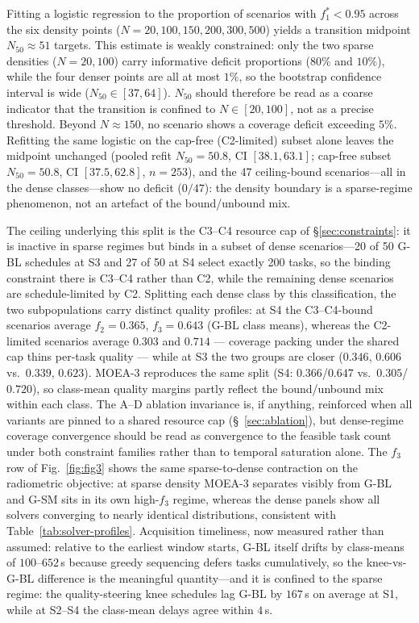 \documentclass[preprint,12pt,authoryear]{elsarticle}
\begin{document}
Fitting a logistic regression to the proportion of scenarios with
$f_1^* < 0.95$ across the six density points ($N=20, 100, 150, 200, 300, 500$)
yields a transition midpoint $N_{50} \approx 51$ targets. This estimate is
weakly constrained: only the two sparse densities ($N=20, 100$) carry
informative deficit proportions ($80\%$ and $10\%$), while the four denser
points are all at most $1\%$, so the bootstrap confidence interval is wide
($N_{50} \in [37, 64]$). $N_{50}$ should therefore be read as a coarse indicator that the
transition is confined to $N \in [20, 100]$, not as a precise threshold.
Beyond $N \approx 150$, no scenario shows a
coverage deficit exceeding $5\%$. Refitting the same logistic on the
cap-free (C2-limited) subset alone leaves the midpoint unchanged (pooled
refit $N_{50} = 50.8$, CI $[38.1, 63.1]$; cap-free subset $N_{50} = 50.8$,
CI $[37.5, 62.8]$, $n=253$), and the 47 ceiling-bound scenarios---all in
the dense classes---show no deficit ($0/47$): the density boundary is a
sparse-regime phenomenon, not an artefact of the bound/unbound mix.

The ceiling underlying this split is the C3--C4 resource cap of
\S\ref{sec:constraints}: it is inactive in sparse regimes but binds in a
subset of dense scenarios---20 of 50 G-BL schedules at S3 and 27 of 50 at
S4 select exactly 200 tasks, so the binding constraint there is C3--C4
rather than C2, while the remaining dense scenarios are schedule-limited
by C2. Splitting each dense class by this classification, the two
subpopulations carry distinct quality profiles: at S4 the C3--C4-bound
scenarios average $f_2 = 0.365$, $f_3 = 0.643$ (G-BL class means),
whereas the C2-limited scenarios average $0.303$ and $0.714$ --- coverage
packing under the shared cap thins per-task quality --- while at S3 the
two groups are closer ($0.346$, $0.606$ vs.\ $0.339$, $0.623$). MOEA-3
reproduces the same split (S4: $0.366$/$0.647$ vs.\ $0.305$/$0.720$), so
class-mean quality margins partly reflect the bound/unbound mix within
each class. The A--D ablation invariance is, if anything, reinforced when
all variants are pinned to a shared resource cap (\S~\ref{sec:ablation}),
but dense-regime coverage convergence should be read as convergence to
the feasible task count under both constraint families rather than to
temporal saturation alone.
The $f_3$ row of Fig.~\ref{fig:fig3} shows the same sparse-to-dense contraction on the
radiometric objective: at sparse density MOEA-3 separates visibly from G-BL
and G-SM sits in its own high-$f_3$ regime, whereas the dense panels show all
solvers converging to nearly identical distributions, consistent with
Table~\ref{tab:solver-profiles}. Acquisition timeliness, now measured rather
than assumed: relative to the earliest window starts, G-BL itself drifts by
class-means of $100$--$652$\,s because greedy sequencing defers tasks
cumulatively, so the knee-vs-G-BL difference is the meaningful quantity---and it is
confined to the sparse regime: the quality-steering knee schedules lag G-BL
by $167$\,s on average at S1, while at S2--S4 the class-mean delays agree
within $4$\,s.
\end{document}
